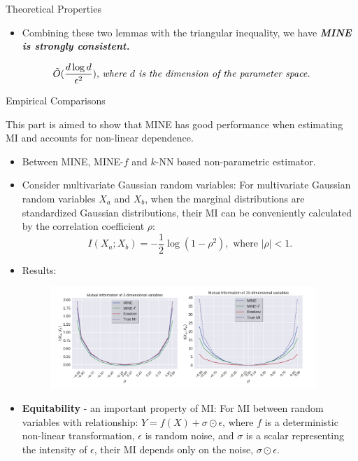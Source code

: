 \documentclass[final]{beamer}
\newlength{\colwidth}
\begin{document}
\begin{frame}[t]
\begin{columns}[t]
\begin{column}{\colwidth}
\begin{block}{Theoretical Properties}
\begin{itemize}
            \item Combining these two lemmas with the triangular inequality,  we have \textit{\textbf{MINE is strongly consistent.}}
        \end{itemize}
            $$\tilde O(\frac{d\log d}{\epsilon^2})\text{, \textit{where $d$ is the dimension of the parameter space.}}$$

\end{block}

\begin{block}{Empirical Comparisons}

    This part is aimed to show that MINE has good performance when estimating MI and accounts for non-linear dependence.

        \begin{itemize}
            \item Between MINE, MINE-$f$ and $k$-NN based non-parametric estimator.

            \item Consider multivariate Gaussian random variables: For multivariate Gaussian random variables $X_a$ and $X_b$, when the marginal distributions are standardized Gaussian distributions, their MI can be conveniently calculated by the correlation coefficient $\rho$:
            \begin{equation}
                 I(X_a; X_b) = -\frac{1}{2} \log(1 - \rho^2), \text{ where } |\rho| < 1.
            \end{equation}
            \item Results:
                \begin{figure}
                    \centering
                    \includegraphics[width=0.95\textwidth]{figures/截屏2024-12-31 08.31.13.png}
                \end{figure}
        \end{itemize}
        
        \begin{itemize}
            \item 
            \textbf{Equitability} - an important property of MI: For MI between random variables with relationship: $Y = f(X) + \sigma \odot \epsilon$, where $f$ is a deterministic non-linear transformation, $\epsilon$ is random noise, and $\sigma$ is a scalar representing the intensity of $\epsilon$, their MI depends only on the noise, $\sigma \odot \epsilon$.


\end{itemize}
\end{block}
\end{column}
\end{columns}
\end{frame}
\end{document}
